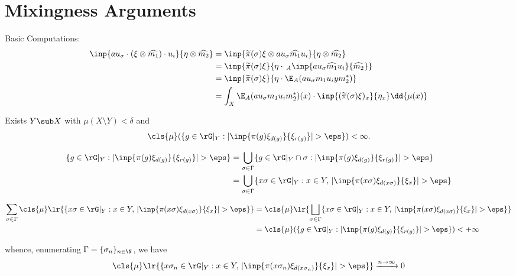 \documentclass[../main.tex]{subfiles}
\begin{document}
\section{Mixingness Arguments}

Basic Computations:
\begin{align*}
    \inp{au_{\sigma}\cdot ( \xi \otimes \widehat{m_{1}}) \cdot u_{i}}{ \eta \otimes  \widehat{m_{2}}} &= \inp{\widetilde{\pi}(\sigma) \xi \otimes  au_{\sigma} \widehat{m_{1}} u_{i}}{ \eta \otimes \widehat{m_{2}}}\\
    &= \inp{\widetilde{\pi}(\sigma) \xi}{ \eta \cdot\, _A \inp{au_{\sigma} \widehat{m_{1}}u_{i}}{\widehat{m_{2}}}}\\
    &= \inp{\widetilde{\pi}(\sigma) \xi}{ \eta \cdot \E_{A}(au_{\sigma} m_{1}u_{i}ym_{2}^{*})}\\
    &= \int_{X}\E_{A}(au_{\sigma} m_{1}u_{i}m_{2}^{*})(x) \cdot \inp{(\widetilde{\pi}(\sigma) \xi)_{x}}{\eta_{x}}\dd{\mu(x)}
\end{align*}

Exists $ Y\sub X $ with $ \mu(X\setminus Y) < \delta $ and
\[
    \cls{\mu}(\{g\in \rG\vert_{Y} : | \inp{\pi(g) \xi_{d(g)}}{\xi_{r(g)}}| > \eps\}) <\infty.
\]

\begin{align*}
    \{g\in \rG\vert_{Y} : | \inp{\pi(g) \xi_{d(g)}}{\xi_{r(g)}}| > \eps\} &= \bigcup_{\sigma\in \Gamma} \{g\in \rG\vert_{Y}\cap \sigma : | \inp{\pi(g) \xi_{d(g)}}{\xi_{r(g)}}| > \eps\} \\
    &= \bigcup_{\sigma\in \Gamma} \{x\sigma \in \rG\vert_{Y} : x\in Y,\, | \inp{\pi(x \sigma) \xi_{d(x \sigma)}}{\xi_{x}}| > \eps\} \\
\end{align*}

\begin{align*}
    \sum_{\sigma\in \Gamma}\cls{\mu}\lr{\{x\sigma \in \rG\vert_{Y} : x\in Y,\, | \inp{\pi(x \sigma) \xi_{d(x \sigma)}}{\xi_{x}}| > \eps\}}&=\cls{\mu}\lr{\bigsqcup_{\sigma\in \Gamma} \{x\sigma \in \rG\vert_{Y} : x\in Y,\, | \inp{\pi(x \sigma) \xi_{d(x \sigma)}}{\xi_{x}}| > \eps\}}\\ 
    &= \cls{\mu}(\{g\in \rG\vert_{Y} : | \inp{\pi(g) \xi_{d(g)}}{\xi_{r(g)}}| > \eps\}) <+\infty
\end{align*}

whence, enumerating $ \Gamma = \{\sigma_{n}\}_{n\in\N} $, we have $$ \cls{\mu}\lr{\{x\sigma_{n} \in \rG\vert_{Y} : x\in Y,\, | \inp{\pi(x \sigma_{n}) \xi_{d(x \sigma_{n})}}{\xi_{x}}| > \eps\}} \xrightarrow{n\to\infty}0$$
\end{document}
